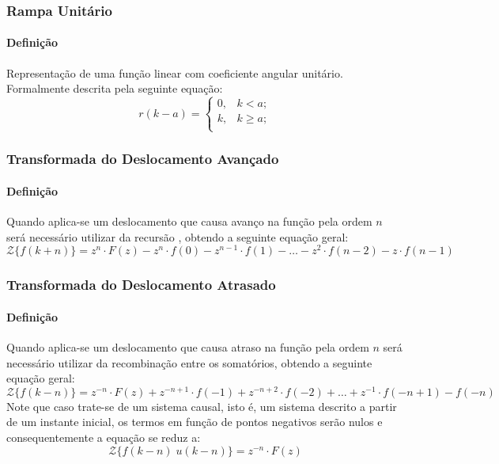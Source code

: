 \documentclass{article}
\begin{document}
\subsubsection{Rampa Unitário}
    \paragraph{Definição}Representação de uma função linear com coeficiente angular unitário. Formalmente descrita pela seguinte equação:
    \begin{equation}
        \boxed{
            r(k - a) = 
            \begin{cases}
                0, & k < a;\\
                k, & k \ge a;\\
            \end{cases}
        }
    \end{equation}

\subsubsection{Transformada do Deslocamento Avançado}
    \paragraph{Definição}Quando aplica-se um deslocamento que causa avanço na função pela ordem $n$ será necessário utilizar da recursão , obtendo a seguinte equação geral:
    \begin{equation}
        \boxed{
            \mathcal{Z}\{ f(k+n) \} = 
            z^{n}\cdot F(z) - 
            z^{n} \cdot f(0) - 
            z^{n-1} \cdot f(1) - \dots - 
            z^{2} \cdot f(n-2) - 
            z\cdot f(n-1)
        }
    \end{equation}

\subsubsection{Transformada do Deslocamento Atrasado}
    \paragraph{Definição}Quando aplica-se um deslocamento que causa atraso na função pela ordem $n$ será necessário utilizar da recombinação entre os somatórios, obtendo a seguinte equação geral:
    \begin{equation}
        \boxed{
            \mathcal{Z}\{ f(k-n) \} = 
            z^{-n}\cdot F(z) + 
            z^{-n+1}\cdot f(-1) + 
            z^{-n+2}\cdot f(-2) + \dots + 
            z^{-1}\cdot f(-n+1) - 
            f(-n)
        }
    \end{equation}
    Note que caso trate-se de um sistema causal, isto é, um sistema descrito a partir de um instante inicial, os termos em função de pontos negativos serão nulos e consequentemente a equação se reduz a:
    \begin{equation*}
        \mathcal{Z}\{ f(k-n) \; u(k-n)\} = z^{-n}\cdot F(z) 
    \end{equation*}
\end{document}

